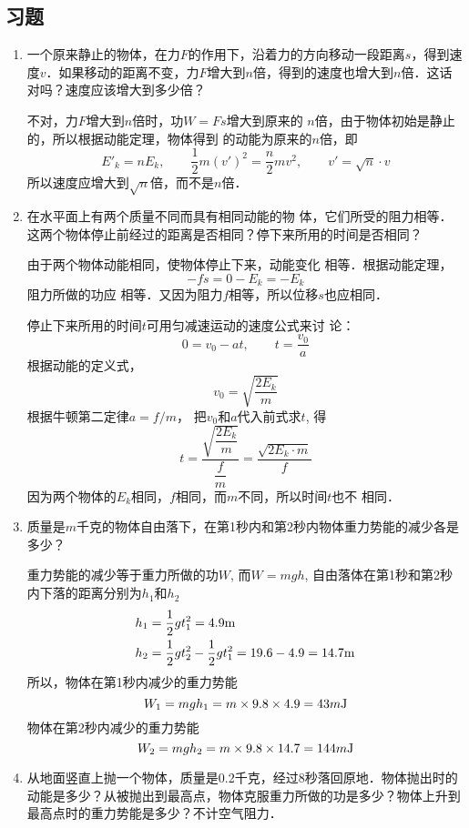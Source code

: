 \subsection{习题}
\begin{enumerate}
    \item 一个原来静止的物体，在力$F$的作用下，沿着力的方向移动一段距离$s$，得到速度$v$．如果移动的距离不变，力$F$增大到$n$倍，得到的速度也增大到$n$倍．这话对吗？速度应该增大到多少倍？

    \begin{solution}
        不对，力$F$增大到$n$倍时，功$W=Fs$增大到原来的
        $n$倍，由于物体初始是静止的，所以根据动能定理，物体得到
        的动能为原来的$n$倍，即
        \[E'_k=nE_k,\qquad \frac{1}{2}m(v')^2=\frac{n}{2}mv^2,\qquad v'=\sqrt{n}\cdot v\]
  所以速度应增大到$\sqrt{n}$倍，而不是$n$倍．
    \end{solution}
    \item 在水平面上有两个质量不同而具有相同动能的物
体，它们所受的阻力相等．这两个物体停止前经过的距离是否相同？停下来所用的时间是否相同？

\begin{solution}
由于两个物体动能相同，使物体停止下来，动能变化
相等．根据动能定理，
\[-fs=0-E_k=-E_k\]
阻力所做的功应
相等．又因为阻力$f$相等，所以位移$s$也应相同．

停止下来所用的时间$t$可用匀减速运动的速度公式来讨
论：
\[0=v_0-at,\qquad t=\frac{v_0}{a}\]
根据动能的定义式，
\[v_0=\sqrt{\frac{2E_k}{m}}\]
根据牛顿第二定律$a=f/m$，
把$v_0$和$a$代入前式求$t$, 得
\[t=\frac{\sqrt{\dfrac{2E_k}{m}}}{\dfrac{f}{m}}=\frac{\sqrt{2E_k\cdot m}}{f}\]
因为两个物体的$E_k$相同，$f$相同，而$m$不同，所以时间$t$也不
相同．
\end{solution}
\item 质量是$m$千克的物体自由落下，在第1秒内和第2秒内物体重力势能的减少各是多少？

\begin{solution}
重力势能的减少等于重力所做的功$W$, 而$W=mgh$, 
自由落体在第1秒和第2秒内下落的距离分别为$h_1$和$h_2$
\[\begin{split}
    h_1&=\frac{1}{2}gt_1^2=4.9{\rm m}\\
    h_2&=\frac{1}{2}gt_2^2-\frac{1}{2}gt_1^2=19.6-4.9=14.7{\rm m}
\end{split}\]
所以，物体在第1秒内减少的重力势能
\[W_1=mgh_1=m\times9.8\times4.9=43m{\rm J}\]
物体在第2秒内减少的重力势能
\[W_2=mgh_2=m\times9.8\times14.7=144m{\rm J}\]
\end{solution}
\item 从地面竖直上抛一个物体，质量是0.2千克，经过8秒落回原地．物体抛出时的动能是多少？从被抛出到最高点，物体克服重力所做的功是多少？物体上升到最高点时的重力势能是多少？不计空气阻力．


\end{enumerate}
